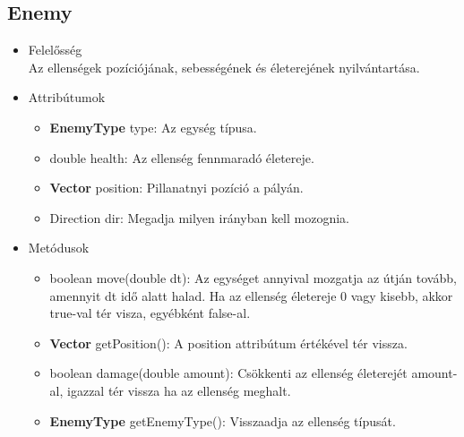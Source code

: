 \subsection{Enemy}
\begin{itemize}
\item Felelősség\\
Az ellenségek pozíciójának, sebességének és életerejének nyilvántartása.
\item Attribútumok
	\begin{itemize}
		\item \textbf{EnemyType} type: Az egység típusa.
		\item double health: Az ellenség fennmaradó életereje.
		\item \textbf{Vector} position: Pillanatnyi pozíció a pályán.
		\item Direction dir: Megadja milyen irányban kell mozognia.
	\end{itemize}
\item Metódusok
	\begin{itemize}
		\item boolean move(double dt): Az egységet annyival mozgatja az útján tovább, amennyit dt idő alatt halad. Ha az ellenség életereje 0 vagy kisebb, akkor true-val tér visza, egyébként false-al.
		\item \textbf{Vector} getPosition(): A position attribútum értékével tér vissza.
		\item boolean damage(double amount): Csökkenti az ellenség életerejét amount-al, igazzal tér vissza ha az ellenség meghalt.
		\item \textbf{EnemyType} getEnemyType(): Visszaadja az ellenség típusát.
	\end{itemize}
\end{itemize}



